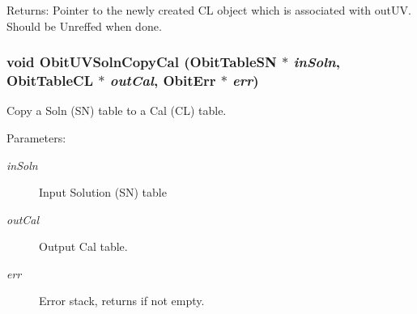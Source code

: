 \begin{Desc}
\item[Returns:]Pointer to the newly created CL object which is associated with out\-UV. Should be Unreffed when done. \end{Desc}
\subsubsection{\setlength{\rightskip}{0pt plus 5cm}void Obit\-UVSoln\-Copy\-Cal ({\bf Obit\-Table\-SN} $\ast$ {\em in\-Soln}, {\bf Obit\-Table\-CL} $\ast$ {\em out\-Cal}, {\bf Obit\-Err} $\ast$ {\em err})}\label{ObitUVSoln2Cal_8c_a0}


Copy a Soln (SN) table to a Cal (CL) table. 

\begin{Desc}
\item[Parameters:]
\begin{description}
\item[{\em in\-Soln}]Input Solution (SN) table \item[{\em out\-Cal}]Output Cal table. \item[{\em err}]Error stack, returns if not empty. \end{description}
\end{Desc}
